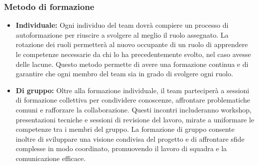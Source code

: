 \subsubsection{Metodo di formazione}
\begin{itemize}
\item \textbf{Individuale:}
Ogni individuo del team dovrà compiere un processo di autoformazione per riuscire a svolgere al meglio il ruolo assegnato. La rotazione dei ruoli permetterà al nuovo occupante di un ruolo di apprendere le competenze necessarie da chi lo ha precedentemente svolto, nel caso avesse delle lacune. Questo metodo permette di avere una formazione continua e di garantire che ogni membro del team sia in grado di svolgere ogni ruolo.
\item \textbf{Di gruppo:}
Oltre alla formazione individuale, il team parteciperà a sessioni di formazione collettiva per condividere conoscenze, affrontare problematiche comuni e rafforzare la collaborazione. Questi incontri includeranno workshop, presentazioni tecniche e sessioni di revisione del lavoro, mirate a uniformare le competenze tra i membri del gruppo. La formazione di gruppo consente inoltre di sviluppare una visione condivisa del progetto e di affrontare sfide complesse in modo coordinato, promuovendo il lavoro di squadra e la comunicazione efficace.
\end{itemize}
